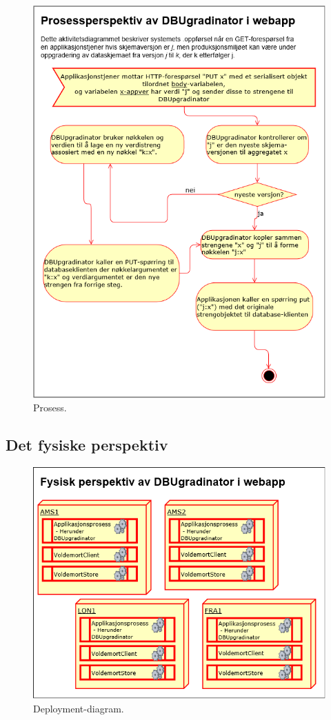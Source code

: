 \newpage

\begin{figure}[!ht]
    \centering
    \includegraphics[scale=0.6]{fig/dbupgradinator-prosess-3.png}
    \caption{Prosess.}
    \label{fig9}
\end{figure}

\newpage

\subsection{Det fysiske perspektiv}

\begin{figure}[!ht]
    \centering
    \includegraphics[scale=0.6]{fig/dbupgradinator-physical.png}
    \caption{Deployment-diagram.}
    \label{fig10}
\end{figure}
